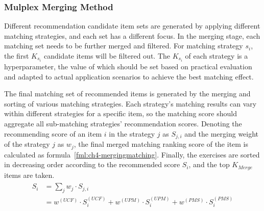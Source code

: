\subsubsection{Mulplex Merging Method}


Different recommendation candidate item sets are generated by applying different matching strategies, and each set has a different focus. In the merging stage, each matching set needs to be further merged and filtered. For matching strategy \(s_i\), the first \(K_{s_i}\) candidate items will be filtered out. The \(K_{s_i}\) of each strategy is a hyperparameter, the value of which should be set based on practical evaluation and adapted to actual application scenarios to achieve the best matching effect.

The final matching set of recommended items is generated by the merging and sorting of various matching strategies. Each strategy's matching results can vary within different strategies for a specific item, so the matching score should aggregate all sub-matching strategies' recommendation scores.  Denoting the recommending score of an item \(i\) in the strategy \(j\) as \(S_{j, i}\) and the merging weight of the strategy \(j\) as \(w_j\), the final merged matching ranking score of the item is calculated as formula~\ref{fml:ch4-mergingmatching}. Finally, the exercises are sorted in decreasing order according to the recommended score \(S_i\), and the top \(K_{Merge}\) items are taken.
\begin{align}\label{fml:ch4-mergingmatching}
    \begin{split}
        S_i & = \sum_{j}{w_j\cdot S_{j,i}}                                                       \\
        & = w^{(UCF)}\cdot S^{(UCF)}_i+w^{(UPM)}\cdot S^{(UPM)}_i+w^{(PMS)}\cdot S^{(PMS)}_i
    \end{split}
\end{align}

